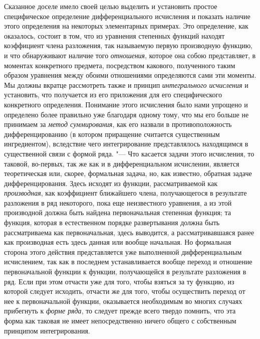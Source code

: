 Сказанное доселе имело своей целью выделить и установить простое
специфическое определение дифференциального исчисления и показать наличие
этого определения на некоторых элементарных примерах. Это определение, как
оказалось, состоит в том, что из уравнения степенных функций находят
коэффициент члена разложения, так называемую первую производную функцию, и
что обнаруживают наличие того {\em отношения}, которое
она собою представляет, в моментах конкретного предмета, посредством
какового, полученного таким образом уравнения между обоими отношениями
определяются сами эти моменты. Мы должны вкратце рассмотреть также и
принцип {\em интегрального исчисления} и установить,
что получается из его приложения для его специфического конкретного
определения. Понимание этого исчисления было нами упрощено и определено
более правильно уже благодаря одному тому, что мы его больше не принимаем
за {\em метод суммирования}, как его назвали в
противоположность дифференцированию (в котором приращение считается
существенным ингредиентом), вследствие чего интегрирование представлялось
находящимся в существенной связи с формой ряда. "--- Что касается задачи этого
исчисления, то таковой, во-первых, так же как и в дифференциальном
исчислении, является теоретическая или, скорее, формальная задача, но, как
известно, обратная задаче дифференцирования. Здесь исходят из функции,
рассматриваемой как {\em производная}, как коэффициент
ближайшего члена, получающегося в результате разложения в ряд некоторого,
пока еще неизвестного уравнения, а из этой производной должна быть найдена
первоначальная степенная функция; та функция, которая в естественном
\label{bkm:bm53b}порядке развертывания должна быть рассматриваема как первоначальная, здесь
выводится, а рассматривавшаяся ранее как производная есть здесь данная или
вообще начальная. Но формальная сторона этого действия представляется уже
выполненной дифференциальным исчислением, так как в последнем
устанавливается вообще переход и отношение первоначальной функции к
функции, получающейся в результате разложения в ряд. Если при этом отчасти
уже для того, чтобы взяться за ту функцию, из которой следует исходить,
отчасти же для того, чтобы осуществить переход от нее к первоначальной
функции, оказывается необходимым во многих случаях прибегнуть к
{\em форме ряда}, то следует прежде всего твердо
помнить, что эта форма как таковая не имеет непосредственно ничего общего с
собственным принципом интегрирования.

